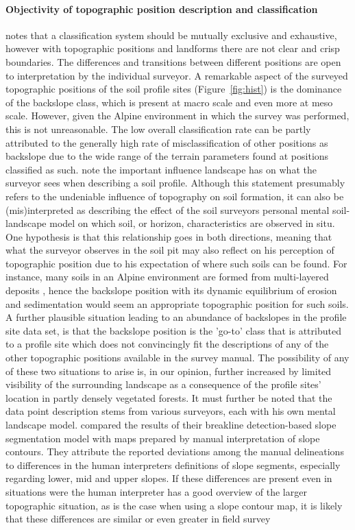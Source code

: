 \documentclass[preprint,12pt,authoryear]{elsarticle}
\begin{document}
\paragraph{Objectivity of topographic position description and classification}
\cite{Congalton1991} notes that a classification system should be mutually exclusive and exhaustive, however with topographic positions and landforms there are not clear and crisp boundaries. The differences and transitions between different positions are open to interpretation by the individual surveyor. A remarkable aspect of the surveyed topographic positions of the soil profile sites (Figure~\ref{fig:hist}) is the dominance of the backslope class, which is present at macro scale and even more at meso scale. However, given the Alpine environment in which the survey was performed, this is not unreasonable. The low overall classification rate can be partly attributed to the generally high rate of misclassification of other positions as backslope due to the wide range of the terrain parameters found at positions classified as such. \cite{Brevik2015} note the important influence landscape has on what the surveyor sees when describing a soil profile. Although this statement presumably refers to the undeniable influence of topography on soil formation, it can also be (mis)interpreted as describing the effect of the soil surveyors personal mental soil-landscape model on which soil, or horizon, characteristics are observed in situ. One hypothesis is that this relationship goes in both directions, meaning that what the surveyor observes in the soil pit may also reflect on his perception of topographic position due to his expectation of where such soils can be found. For instance, many soils in an Alpine environment are formed from multi-layered deposits \citep{Baruck2016,Geitner2011a}, hence the backslope position with its dynamic equilibrium of erosion and sedimentation would seem an appropriate topographic position for such soils. A further plausible situation leading to an abundance of backslopes in the profile site data set, is that the backslope position is the 'go-to' class that is attributed to a profile site which does not convincingly fit the descriptions of any of the other topographic positions available in the survey manual. The possibility of any of these two situations to arise is, in our opinion, further increased by limited visibility of the surrounding landscape as a consequence of the profile sites' location in partly densely vegetated forests. It must further be noted that the data point description stems from various surveyors, each with his own mental landscape model. \cite{Matsuura2012} compared the results of their breakline detection-based slope segmentation model with maps prepared by manual interpretation of slope contours. They attribute the reported deviations among the manual delineations to differences in the human interpreters definitions of slope segments, especially regarding lower, mid and upper slopes. If these differences are present even in situations were the human interpreter has a good overview of the larger topographic situation, as is the case when using a slope contour map, it is likely that these differences are similar or even greater in field survey 
\end{document}
